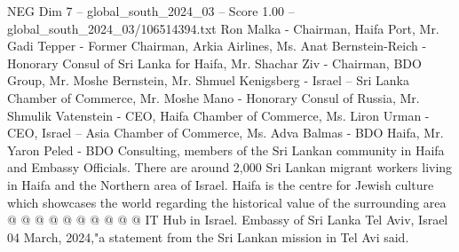 \begin{textsample}{NEG Dim 7 – global\_south\_2024\_03 – Score 1.00 – global\_south\_2024\_03/106514394.txt}
Ron Malka - Chairman, Haifa Port, Mr.
Gadi Tepper - Former Chairman, Arkia Airlines, Ms.
Anat Bernstein-Reich - Honorary Consul of Sri Lanka for Haifa, Mr.
Shachar Ziv - Chairman, BDO Group, Mr.
Moshe Bernstein, Mr.
Shmuel Kenigsberg - Israel -- Sri Lanka Chamber of Commerce, Mr.
Moshe Mano - Honorary Consul of Russia, Mr.
Shmulik Vatenstein - CEO, Haifa Chamber of Commerce, Ms.
Liron Urman - CEO, Israel -- Asia Chamber of Commerce, Ms.
Adva Balmas - BDO Haifa, Mr.
Yaron Peled - BDO Consulting, members of the Sri Lankan community in Haifa and Embassy Officials.
There are around 2,000 Sri Lankan migrant workers living in Haifa and the Northern area of Israel.
Haifa is the centre for Jewish culture which showcases the world regarding the historical value of the surrounding area @ @ @ @ @ @ @ @ @ @ IT Hub in Israel.
Embassy of Sri Lanka Tel Aviv, Israel 04 March, 2024,"a statement from the Sri Lankan mission in Tel Avi said.

\end{textsample}
